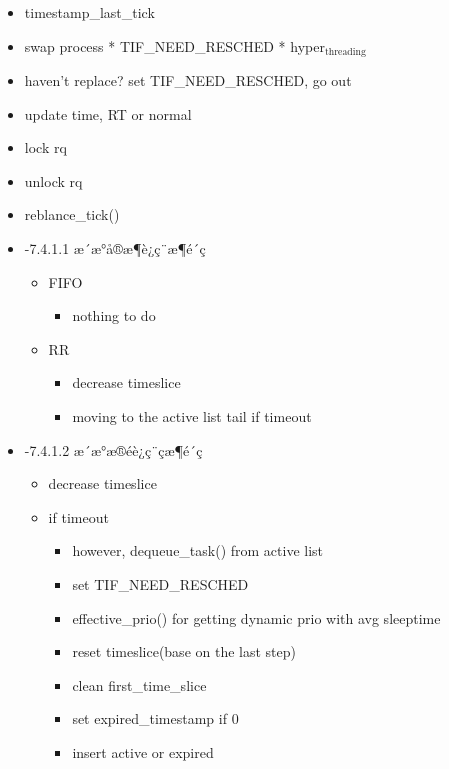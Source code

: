 \documentclass[11pt]{article}
\begin{document}
\begin{itemize}
\item timestamp\_last\_tick
\item swap process
  * TIF\_NEED\_RESCHED
  * hyper$_{\mathrm{threading}}$
\item haven't replace? set TIF\_NEED\_RESCHED, go out
\item update time, RT or normal
\item lock rq
\item unlock rq
\item reblance\_tick()
\end{itemize}
\begin{itemize}

\item -7.4.1.1 æ´æ°å®æ¶è¿ç¨æ¶é´ç\\
\label{sec-2.4.1.1}

\begin{itemize}
\item FIFO

\begin{itemize}
\item nothing to do
\end{itemize}

\item RR

\begin{itemize}
\item decrease timeslice
\item moving to the active list tail if timeout
\end{itemize}

\end{itemize}

\item -7.4.1.2 æ´æ°æ®éè¿ç¨çæ¶é´ç\\
\label{sec-2.4.1.2}

\begin{itemize}
\item decrease timeslice
\item if timeout

\begin{itemize}
\item however, dequeue\_task() from active list
\item set TIF\_NEED\_RESCHED
\item effective\_prio() for getting dynamic prio with avg sleeptime
\item reset timeslice(base on the last step)
\item clean first\_time\_slice
\item set expired\_timestamp if 0
\item insert active or expired


\end{itemize}
\end{itemize}
\end{itemize}
\end{document}
